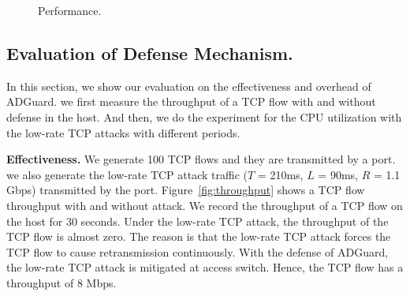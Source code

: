 \documentclass[conference]{IEEEtran}
\newcommand{\TheName}{ADGuard}
\begin{document}
\begin{figure}
\vspace{0in}
\centering

\vspace{-0.1in}
\caption{\small{Performance.}}
\label{fig:Performance}
\vspace{-0.2in}
\end{figure}

\subsection{Evaluation of Defense Mechanism.} 
In this section, we show our evaluation on the effectiveness and overhead of \TheName{}. we first measure the throughput of a TCP flow with and without defense in the host. And then, we do the experiment for the CPU utilization with the low-rate TCP attacks with different periods.

\noindent \textbf{Effectiveness.}  We generate 100 TCP flows and they are transmitted by a port. we also generate the low-rate TCP attack traffic ($T$ = 210ms, $L$ = 90ms, $R$ = 1.1 Gbps) transmitted by the port. Figure~\ref{fig:throughput} shows a TCP flow throughput with and without attack. We record the throughput of a TCP flow on the host for 30 seconds. Under the low-rate TCP attack, the throughput of the TCP flow is almost zero. The reason is that the low-rate TCP attack forces the TCP flow to cause retransmission continuously. With the defense of \TheName{}, the low-rate TCP attack is mitigated at access switch. Hence, the TCP flow has a throughput of 8 Mbps.
\end{document}
